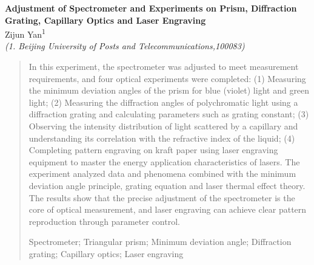 \documentclass[12pt,a4paper]{article}
\begin{document}
\vspace{1cm}




\begin{center}

    {\fontsize{15}{18}\selectfont\bfseries Adjustment of Spectrometer and Experiments on Prism, Diffraction Grating, Capillary Optics and Laser Engraving} \\[0.3\baselineskip]



    {\fontsize{10.5}{12.6}\selectfont Zijun Yan\textsuperscript{1}} \\[0.3\baselineskip]



    {\fontsize{9}{10.8}\selectfont\itshape (1. Beijing University of Posts and Telecommunications,100083)} \\[0.5\baselineskip]
\end{center}




\begin{quote}

    \fontsize{9}{10.8}\selectfont

    \setlength{\leftskip}{2em}

    \setlength{\rightskip}{2em}



     In this experiment, the spectrometer was adjusted to meet measurement requirements, and four optical experiments were completed: (1) Measuring the minimum deviation angles of the prism for blue (violet) light and green light; (2) Measuring the diffraction angles of polychromatic light using a diffraction grating and calculating parameters such as grating constant; (3) Observing the intensity distribution of light scattered by a capillary and understanding its correlation with the refractive index of the liquid; (4) Completing pattern engraving on kraft paper using laser engraving equipment to master the energy application characteristics of lasers. The experiment analyzed data and phenomena combined with the minimum deviation angle principle, grating equation and laser thermal effect theory. The results show that the precise adjustment of the spectrometer is the core of optical measurement, and laser engraving can achieve clear pattern reproduction through parameter control.



    \vspace{0.5\baselineskip}

     Spectrometer; Triangular prism; Minimum deviation angle; Diffraction grating; Capillary optics; Laser engraving

\end{quote}
\end{document}
